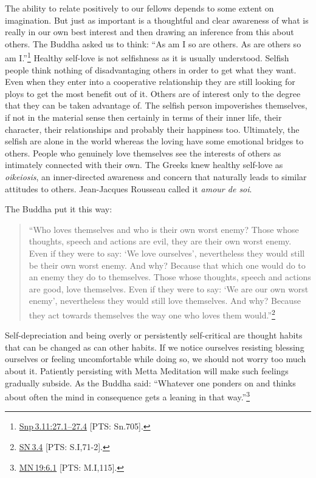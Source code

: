\documentclass[10pt, openright]{book}
\begin{document}
The ability to relate positively to our fellows depends to some extent on imagination. But just as important is a thoughtful and clear awareness of what is really in our own best interest and then drawing an inference from this about others. The Buddha asked us to think: “As am I so are others. As are others so am I.”\footnote {\href{https://suttacentral.net/snp3.11/en/sujato\#27.1}{Snp 3.11:27.1–27.4} [PTS: Sn.705].} Healthy self-love is not selfishness as it is usually understood. Selfish people think nothing of disadvantaging others in order to get what they want. Even when they enter into a cooperative relationship they are still looking for ploys to get the most benefit out of it. Others are of interest only to the degree that they can be taken advantage of. The selfish person impoverishes themselves, if not in the material sense then certainly in terms of their inner life, their character, their relationships and probably their happiness too. Ultimately, the selfish are alone in the world whereas the loving have some emotional bridges to others. People who genuinely love themselves see the interests of others as intimately connected with their own. The Greeks knew healthy self-love as \textit{oikeiosis}, an inner-directed awareness and concern that naturally leads to similar attitudes to others. Jean-Jacques Rousseau called it \textit{amour de soi}.


The Buddha put it this way:


\begin{quote}


“Who loves themselves and who is their own worst enemy? Those whose thoughts, speech and actions are evil, they are their own worst enemy. Even if they were to say: ‘We love ourselves’, nevertheless they would still be their own worst enemy. And why? Because that which one would do to an enemy they do to themselves. Those whose thoughts, speech and actions are good, love themselves. Even if they were to say: ‘We are our own worst enemy’, nevertheless they would still love themselves. And why? Because they act towards themselves the way one who loves them would.”\footnote {\href{https://suttacentral.net/sn3.4/en/sujato}{SN 3.4} [PTS: S.I,71-2].}




\end{quote}
Self-depreciation and being overly or persistently self-critical are thought habits that can be changed as can other habits. If we notice ourselves resisting blessing ourselves or feeling uncomfortable while doing so, we should not worry too much about it. Patiently persisting with Metta Meditation will make such feelings gradually subside. As the Buddha said: “Whatever one ponders on and thinks about often the mind in consequence gets a leaning in that way.”\footnote {\href{https://suttacentral.net/mn19/en/sujato\#6.1}{MN 19:6.1} [PTS: M.I,115].}
\end{document}

